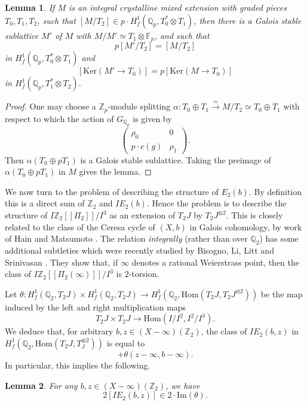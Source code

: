\documentclass[11pt]{amsart}
\def\Z{\mathbb Z}
\def\Q{\mathbb Q}
\def\F{\mathbb F}
\theoremstyle{plain}
\newtheorem{lemma}{Lemma}
\theoremstyle{definition}
\newcommand{\Ker}{\mathrm{Ker}}
\newcommand{\Hom}{\mathrm{Hom}}
\begin{document}
\begin{lemma}\label{lemma:trivial}
If $M$ is an integral crystalline mixed extension with graded pieces $T_0 ,T_1 ,T_2 $, such that $[M/T_2 ]\in p\cdot H^1 _f (\Q _p ,T_0 ^* \otimes T_1 )$, then there is a Galois stable sublattice $M'$ of $M$ with $M/M' \simeq T_1 \otimes \F _p $, and such that
\[
p[M' /T_2 ]=[M/T_2 ]
\]
in $H^1 _f (\Q _p ,T_0 ^* \otimes T_1 )$ and 
\[
[\Ker (M'\to T_0 )]=p[\Ker (M\to T_0 )]
\]
in $H^1 _f (\Q _p ,T_1 ^* \otimes T_2 )$.
\end{lemma}
\begin{proof}
One may choose a $\Z _p $-module splitting $\alpha :T_0 \oplus T_1 \stackrel{\simeq }{\longrightarrow }M/T_2 \simeq T_0 \oplus T_1$ with respect to which the action of $G_{\Q _p }$ is given by
\[
\left( \begin{array}{cc} \rho _0 & 0 \\ p\cdot c(g) & \rho _1 \end{array} \right) .
\] 
Then $\alpha (T_0 \oplus pT_1 )$ is a Galois stable sublattice. Taking the preimage of $\alpha (T_0 \oplus pT_1 )$ in $M$ gives the lemma.
\end{proof}


We now turn to the problem of describing the structure of $E_2 (b)$. By definition this is a direct sum of $\Z _2 $ and $IE_2 (b)$. Hence the problem is to describe the structure of $I\Z _2 [\! [\Pi _2 ]\! ]/I^3 $ as an extension of $T_2 J$ by $T_2 J^{\otimes 2}$. This is closely related to the class of the Ceresa cycle of $(X,b)$ in Galois cohomology, by work of Hain and Matsumoto \cite{HM}. The relation \textit{integrally} (rather than over $\Q _2 $) has some additional subtleties which were recently studied by Bisogno, Li, Litt and Srinivasan \cite{BLLS}. They show that, if $\infty $ denotes a rational Weierstrass point, then the class of $I\Z _2 [\! [\Pi _2 (\infty ) ]\! ]/I^3 $ is $2$-torsion.


Let $\theta :H^1 _f (\Q _2 ,T_2 J)\times H^1 _f (\Q _2 ,T_2 J)\to H^1 _f (\Q _2 ,\Hom (T_2 J,T_2 J^{\otimes 2}))$ 
be the map induced by the left and right multiplication maps
\begin{equation}\label{eqn}
T_2 J\times T_2 J\to \Hom (I/I^2 ,I^2 /I^3 ).
\end{equation}
We deduce that, for arbitrary $b,z\in (X-\infty )(\Z _2 )$, the class of $IE_2 (b,z)$ in $H^1 _f (\Q _2 ,\Hom (T_2 J,T_J^{\otimes 2}))$ is equal to 
\begin{equation}
[E_2 (\infty )]+\theta (z-\infty ,b-\infty ).
\end{equation}
In particular, this implies the following.
\begin{lemma}
For any $b,z\in (X-\infty )(\Z _2 )$, we have
\[
2[IE_2 (b,z)]\in 2\cdot \mathrm{Im}(\theta ).
\]
\end{lemma}
\end{document}
